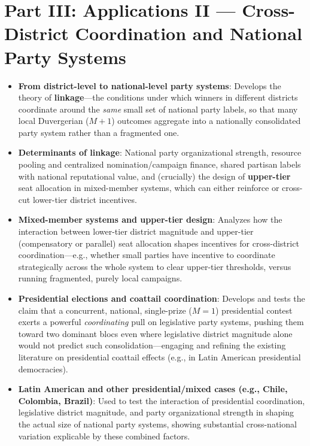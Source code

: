 \documentclass[12pt]{article}
\begin{document}
\section{Part III: Applications II --- Cross-District Coordination and National Party Systems}

\begin{itemize}[leftmargin=*, itemsep=4pt]
    \item \textbf{From district-level to national-level party systems}: Develops the theory of \textbf{linkage}---the conditions under which winners in different districts coordinate around the \emph{same} small set of national party labels, so that many local Duvergerian ($M+1$) outcomes aggregate into a nationally consolidated party system rather than a fragmented one.
    \item \textbf{Determinants of linkage}: National party organizational strength, resource pooling and centralized nomination/campaign finance, shared partisan labels with national reputational value, and (crucially) the design of \textbf{upper-tier} seat allocation in mixed-member systems, which can either reinforce or cross-cut lower-tier district incentives.
    \item \textbf{Mixed-member systems and upper-tier design}: Analyzes how the interaction between lower-tier district magnitude and upper-tier (compensatory or parallel) seat allocation shapes incentives for cross-district coordination---e.g., whether small parties have incentive to coordinate strategically across the whole system to clear upper-tier thresholds, versus running fragmented, purely local campaigns.
    \item \textbf{Presidential elections and coattail coordination}: Develops and tests the claim that a concurrent, national, single-prize ($M=1$) presidential contest exerts a powerful \emph{coordinating} pull on legislative party systems, pushing them toward two dominant blocs even where legislative district magnitude alone would not predict such consolidation---engaging and refining the existing literature on presidential coattail effects (e.g., in Latin American presidential democracies).
    \item \textbf{Latin American and other presidential/mixed cases (e.g., Chile, Colombia, Brazil)}: Used to test the interaction of presidential coordination, legislative district magnitude, and party organizational strength in shaping the actual size of national party systems, showing substantial cross-national variation explicable by these combined factors.
\end{itemize}
\end{document}
